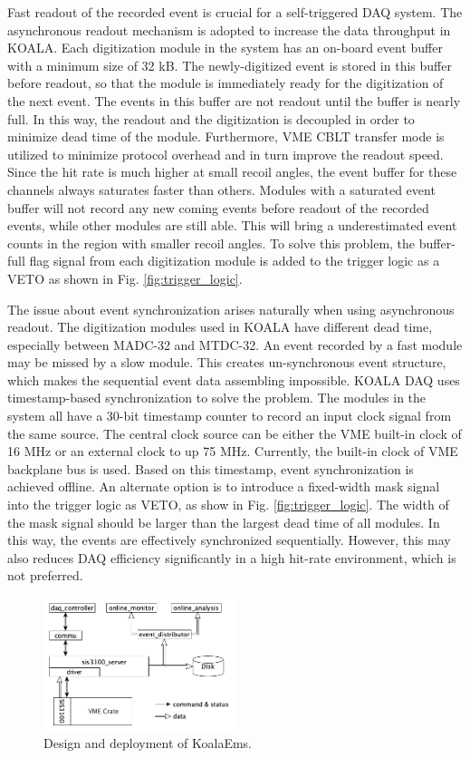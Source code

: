 \documentclass[number,5p]{elsarticle}
\begin{document}
Fast readout of the recorded event is crucial for a self-triggered DAQ system.
The asynchronous readout mechanism is adopted to increase the data throughput in KOALA.
Each digitization module in the system has an on-board event buffer with a minimum size of 32 kB.
The newly-digitized event is stored in this buffer before readout, so that the
module is immediately ready for the digitization of the next event.
The events in this buffer are not readout until the buffer is nearly full. In
this way, the readout and the digitization is decoupled in order to minimize dead time of the module.
Furthermore, VME CBLT transfer mode is utilized to minimize protocol overhead and in turn improve the readout speed.
Since the hit rate is much higher at small recoil angles, the event buffer for these channels always saturates faster than others.
Modules with a saturated event buffer will not record any new coming events before readout of the recorded events, while other modules are still able.
This will bring a underestimated event counts in the region with smaller recoil angles.
To solve this problem, the buffer-full flag signal from each digitization
module is added to the trigger logic as a VETO as shown in Fig. \ref{fig:trigger_logic}.

The issue about event synchronization arises naturally when using asynchronous readout.
The digitization modules used in KOALA have different dead time, especially between MADC-32 and MTDC-32.
An event recorded by a fast module may be missed by a slow module. This creates un-synchronous event structure, which makes the sequential event data assembling impossible. 
KOALA DAQ uses timestamp-based synchronization to solve the problem.
The modules in the system all have a 30-bit timestamp counter to record an input clock signal from the same source.
The central clock source can be either the VME built-in clock of 16 MHz or an external clock to up 75 MHz.
Currently, the built-in clock of VME backplane bus is used. 
Based on this timestamp, event synchronization is achieved offline.
An alternate option is to introduce a fixed-width mask signal into the trigger logic as VETO, as show in Fig. \ref{fig:trigger_logic}.
The width of the mask signal should be larger than the largest dead time of all modules.
In this way, the events are effectively synchronized sequentially. 
However, this may also reduces DAQ efficiency significantly in a high hit-rate environment, which is not preferred.

\begin{figure}[htbp]
\centering
\includegraphics[width=0.5\textwidth]{./koalaems_deployment.png}
\caption{Design and deployment of KoalaEms.}
\label{fig:koalaems}
\end{figure}
\end{document}
